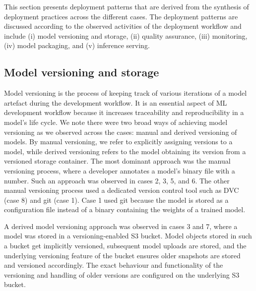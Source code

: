 This section presents deployment patterns that are derived from the synthesis of deployment practices across the different cases. The deployment patterns are discussed according to the observed activities of the deployment workflow and include (i) model versioning and storage, (ii) quality assurance, (iii) monitoring, (iv) model packaging, and (v) inference serving. 

\subsection{Model versioning and storage}
Model versioning is the process of keeping track of various iterations of a model artefact during the development workflow. It is an essential aspect of ML development workflow because it increases traceability and reproducibility in a model's life cycle. We note there were two broad ways of achieving model versioning as we observed across the cases: manual and derived versioning of models. By manual versioning, we refer to explicitly assigning versions to a model, while derived versioning refers to the model obtaining its version from a versioned storage container. The most dominant approach was the manual versioning process, where a developer annotates a model's binary file with a number. Such an approach was observed in cases 2, 3, 5, and 6. The other manual versioning process used a dedicated version control tool such as DVC (case 8) and git (case 1). Case 1 used git because the model is stored as a configuration file instead of a binary containing the weights of a trained model. 

A derived model versioning approach was observed in cases 3 and 7, where a model was stored in a versioning-enabled S3 bucket. Model objects stored in such a bucket get implicitly versioned, subsequent model uploads are stored, and the underlying versioning feature of the bucket ensures older snapshots are stored and versioned accordingly. The exact behaviour and functionality of the versioning and handling of older versions are configured on the underlying S3 bucket.

